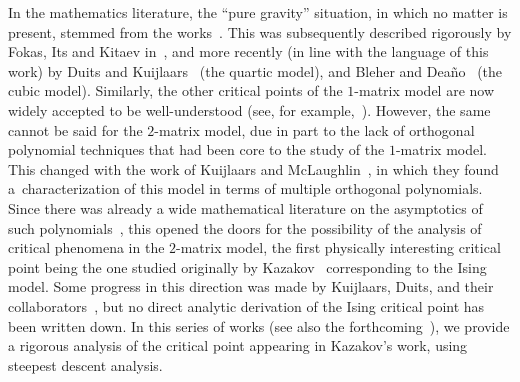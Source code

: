 \documentclass[pdftex]{sigma}
\numberwithin{equation}{section}
\begin{document}
In the mathematics literature, the ``pure gravity'' situation, in which no matter is present, stemmed from the works~\cite{DS,GM1,KM}. This was subsequently described rigorously by Fokas, Its and Kitaev in~\cite{FIK1,FIK2}, and more recently (in line with the language of this work) by Duits and Kuijlaars~\cite{DK0} (the quartic model), and Bleher and Dea\~{n}o~\cite{BleherDeano} (the cubic model). Similarly, the other critical points of the $1$-matrix model are now widely accepted to be well-understood (see, for example,~\cite{CV}). However, the same cannot be said for the $2$-matrix model, due in part to the lack of orthogonal polynomial techniques that had been core to the study of the $1$-matrix model. This changed with the work of Kuijlaars and McLaughlin~\cite{KM}, in which they found a~characterization of this model in terms of multiple orthogonal polynomials. Since there was already a wide mathematical literature on the asymptotics of such polynomials~\cite{Aptekarev,NikishinSorokin,VanAssche}, this opened the doors for the possibility of
the analysis of critical phenomena in the $2$-matrix model, the first physically interesting critical point being the one studied originally by Kazakov~\cite{Kazakov1} corresponding to the Ising model. Some progress in this direction was made by Kuijlaars, Duits, and their collaborators~\cite{DG,DGK,DK1,DKM}, but no direct analytic derivation of the Ising critical point has been
written down. In this series of works (see also the forthcoming~\cite{DHL3, DHL2}), we provide a rigorous analysis of the critical point appearing in Kazakov's work, using steepest descent analysis.
\end{document}
